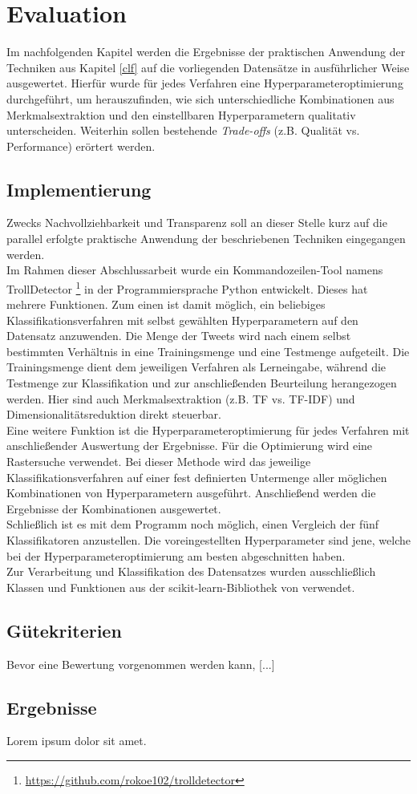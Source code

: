\section{Evaluation}\raggedbottom
Im nachfolgenden Kapitel werden die Ergebnisse der praktischen Anwendung der Techniken aus Kapitel \ref{clf} auf die vorliegenden Datensätze in ausführlicher Weise ausgewertet. Hierfür wurde für jedes Verfahren eine Hyperparameteroptimierung durchgeführt, um herauszufinden, wie sich unterschiedliche Kombinationen aus  Merkmalsextraktion und den einstellbaren Hyperparametern qualitativ unterscheiden. Weiterhin sollen bestehende \textit{Trade-offs} (z.B. Qualität vs. Performance) erörtert werden.
\subsection{Implementierung} 
Zwecks Nachvollziehbarkeit und Transparenz soll an dieser Stelle kurz auf die parallel erfolgte praktische Anwendung der beschriebenen Techniken eingegangen werden.\\
Im Rahmen dieser Abschlussarbeit wurde ein Kommandozeilen-Tool namens \glqq TrollDetector\grqq{} \footnote{\url{https://github.com/rokoe102/trolldetector}} in der Programmiersprache Python entwickelt. Dieses hat mehrere Funktionen. Zum einen ist damit möglich, ein beliebiges Klassifikationsverfahren mit selbst gewählten Hyperparametern auf den Datensatz anzuwenden. Die Menge der Tweets wird nach einem selbst bestimmten Verhältnis in eine Trainingsmenge und eine Testmenge aufgeteilt. Die Trainingsmenge dient dem jeweiligen Verfahren als Lerneingabe, während die Testmenge zur Klassifikation und zur anschließenden Beurteilung herangezogen werden. Hier sind auch Merkmalsextraktion (z.B. TF vs. TF-IDF) und Dimensionalitätsreduktion direkt steuerbar.\\
Eine weitere Funktion ist die Hyperparameteroptimierung für jedes Verfahren mit anschließender Auswertung der Ergebnisse. Für die Optimierung wird eine Rastersuche verwendet. Bei dieser Methode wird das jeweilige Klassifikationsverfahren auf einer fest definierten Untermenge aller möglichen Kombinationen von Hyperparametern ausgeführt. Anschließend werden die Ergebnisse der Kombinationen ausgewertet.\\
Schließlich ist es mit dem Programm noch möglich, einen Vergleich der fünf Klassifikatoren anzustellen. Die voreingestellten Hyperparameter sind jene, welche bei der Hyperparameteroptimierung am besten abgeschnitten haben.\\
Zur Verarbeitung und Klassifikation des Datensatzes wurden ausschließlich Klassen und Funktionen aus der \glqq scikit-learn\grqq-Bibliothek von \citet{scikit-learn} verwendet.
\subsection{Gütekriterien}
Bevor eine Bewertung vorgenommen werden kann, [...]

\pagebreak\pagebreak
\subsection{Ergebnisse}
Lorem ipsum dolor sit amet.